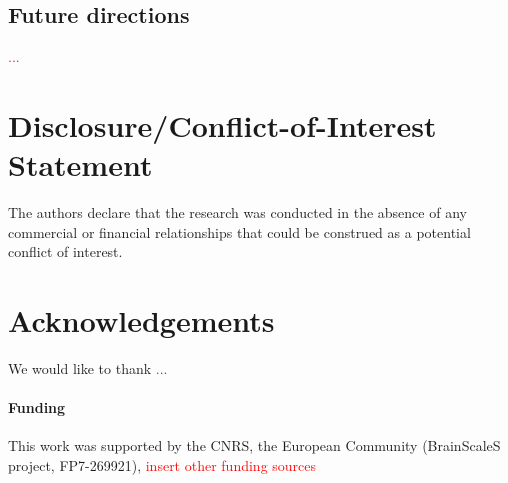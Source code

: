 \documentclass{frontiers}
\newcommand{\missing}[1]{\textcolor{red}{#1}}
\begin{document}
\subsection{Future directions}

\missing{...}


\section*{Disclosure/Conflict-of-Interest Statement}
The authors declare that the research was conducted in the absence of any commercial or financial relationships that could be construed as a potential conflict of interest.

\section*{Acknowledgements}
We would like to thank \missing{...}

\paragraph{Funding\textcolon} This work was supported by the CNRS, the European Community (BrainScaleS project, FP7-269921), \missing{insert other funding sources}



\end{document}
